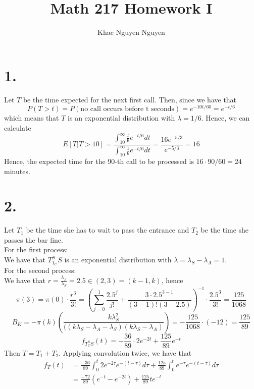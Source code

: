 \documentclass[11pt]{article}
\title{\textbf{Math 217 Homework I}}
\author{Khac Nguyen Nguyen}
\date{}
\begin{document}
\section*{1.}
Let $T$ be the time expected for the next first call. Then, since we have that 
\[
    P(T>t) = P(\text{no call occurs before t seconds}) = e^{-10t/60} = e^{-t/6}   
\]
which means that $T$ is an exponential distribution with $\lambda = 1/6$. Hence, we
can calculate
\[
    E[T|T>10] = \frac{\int_{10}^\infty \frac{t}{6} e^{-t/6} dt}{\int_{10}^\infty \frac{1}{6} e^{-t/6} dt} = \frac{16e^{-5/3}}{e^{-5/3}} = 16    
\]
Hence, the expected time for the 90-th call to be processed is $16 \cdot 90 / 60 = 24$ minutes.
\pagebreak
\section*{2.}
Let $T_1$ be the time she has to wait to pass the entrance and $T_2$ be the time she passes the bar line. \\
For the first process: \\
We have that $T_{1_C}^SS$ is an exponential distribution with $\lambda = \lambda_S - \lambda_A = 1$. \\
For the second process: \\
We have that $r = \frac{\lambda_A}{\lambda_S} = 2.5 \in (2,3) = (k-1,k)$, hence
\[
    \pi(3) 
    = \pi(0) \cdot \frac{r^3}{3!} 
    = \left(\sum_{j=0}^1 \frac{2.5^j}{j!} + \frac{3 \cdot 2.5^{3-1}}{(3-1)!(3-2.5)} \right)^{-1} \cdot \frac{2.5^3}{3!} = \frac{125}{1068}
\]
\[
    B_K = -\pi(k) \left( \frac{k\lambda_S^2}{((k\lambda_S - \lambda_A - \lambda_S)(k \lambda_S - \lambda_A)}\right) = - \frac{125}{1068} \cdot (-12) = \frac{125}{89}
\]
\[
    f_{T_C^SS}(t) = -\frac{36}{89} \cdot 2e^{-2t} + \frac{125}{89} e^{-t}    
\]
Then $T = T_1 + T_2$. Applying convolution twice, we have that 
\begin{equation*}
    \begin{aligned}
        f_T(t) &= \frac{-36}{89} \int_0^t 2e^{-2\tau} e^{-(t-\tau)} d\tau + \frac{125}{89} \int_0^t e^{-\tau}e^{-(t-\tau)} d\tau \\
        &= \frac{-72}{89} (e^{-t}-e^{-2t}) + \frac{125}{89} te^{-t} \\
    \end{aligned}
\end{equation*}
\pagebreak
\end{document}
